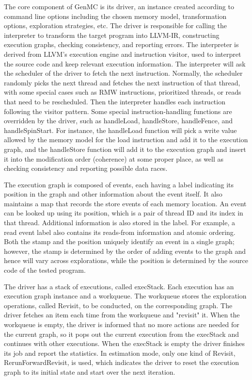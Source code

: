 The core component of GenMC is its driver, an instance created according to command line options including the chosen memory model, transformation options, exploration strategies, etc. The driver is responsible for calling the interpreter to transform the target program into LLVM-IR, constructing execution graphs, checking consistency, and reporting errors. The interpreter is derived from LLVM's execution engine and instruction visitor, used to interpret the source code and keep relevant execution information. The interpreter will ask the scheduler of the driver to fetch the next instruction. Normally, the scheduler randomly picks the next thread and fetches the next instruction of that thread, with some special cases such as RMW instructions, prioritized threads, or reads that need to be rescheduled. Then the interpreter handles each instruction following the visitor pattern. Some special instruction-handling functions are overridden by the driver, such as handleLoad, handleStore, handleFence, and handleSpinStart. For instance, the handleLoad function will pick a write value allowed by the memory model for the load instruction and add it to the execution graph, and the handleStore function will add it to the execution graph and insert it into the modification order (coherence) at some proper place, as well as checking consistency and reporting possible data races.

The execution graph is composed of events, each having a label indicating its position in the graph and other information about the event itself. It also maintains a map that records the store events of each memory location. An event can be looked up using its position, which is a pair of thread ID and its index in that thread. Additional information is also stored in the label. For example, a read event label also contains its reads-from information and atomic ordering. Both the stamp and the position uniquely identify an event in a single graph; however, the stamp is determined by the order of adding events to the graph and hence will vary across explorations, while the position is determined by the source code of the tested program.

The driver has a stack of executions, called execStack. Each execution has an execution graph instance and a workqueue. The workqueue stores the exploration operations, called Revisit, to be conducted, on the corresponding graph. The driver fetches an item each time from the workqueue and "revisit" it. When the workqueue is empty, the driver is informed that no more actions are needed for the current graph, so it pops out the current execution from the execStack and continues with other executions. When the execStack is empty the driver finishes its job and report the statistics. In estimation mode, only one kind of Revisit, RerunForwardRevisit, is used, which indicates the driver to reset the execution graph to its initial state and start over the next iteration.

